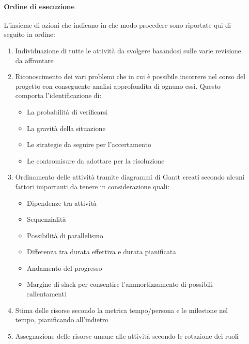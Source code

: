 			\paragraph{Ordine di esecuzione}
			L'insieme di azioni che indicano in che modo procedere sono riportate qui di seguito in ordine:
			\begin{enumerate}
				\item Individuazione di tutte le attività da svolgere basandosi sulle varie revisione da affrontare
				\item Riconoscimento dei vari problemi che in cui è possibile incorrere nel corso del progetto con conseguente analisi approfondita di ognuno essi. Questo comporta l'identificazione di:
				\begin{itemize}
					\item La probabilità di verificarsi
					\item La gravità della situazione
					\item Le strategie da seguire per l'accertamento
					\item Le contromisure da adottare per la risoluzione
				\end{itemize}
				\item Ordinamento delle attività tramite diagrammi di Gantt creati secondo alcuni fattori importanti da tenere in considerazione quali:
				\begin{itemize}
					\item Dipendenze tra attività
					\item Sequenzialità
					\item Possibilità di parallelismo
					\item Differenza tra durata effettiva e durata pianificata %
					\item Andamento del progresso
					\item Margine di slack per consentire l'ammortizzamento di possibili rallentamenti
				\end{itemize}
			\item Stima delle risorse secondo la metrica tempo/persona e le milestone nel tempo, pianificando all'indietro %
			\item Assegnazione delle risorse umane alle attività secondo le rotazione dei ruoli %
			\end{enumerate}

